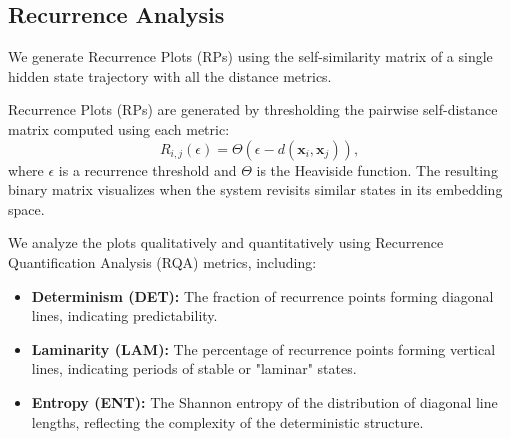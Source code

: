 \documentclass[a4paper,12pt]{article}
\begin{document}

\subsection{Recurrence Analysis}
\label{subsec:recurrence_analysis}
We generate Recurrence Plots (RPs) using the self-similarity matrix of a single hidden state trajectory with all the distance metrics. 

Recurrence Plots (RPs) are generated by thresholding the pairwise self-distance matrix computed using each metric:
\begin{equation}
    R_{i,j}(\epsilon) = \Theta(\epsilon - d(\mathbf{x}_i, \mathbf{x}_j)),
\end{equation}
where $\epsilon$ is a recurrence threshold and $\Theta$ is the Heaviside function. The resulting binary matrix visualizes when the system revisits similar states in its embedding space.

We analyze the plots qualitatively and quantitatively using Recurrence Quantification Analysis (RQA) metrics, including:
\begin{itemize}
    \item \textbf{Determinism (DET):} The fraction of recurrence points forming diagonal lines, indicating predictability.
    \item \textbf{Laminarity (LAM):} The percentage of recurrence points forming vertical lines, indicating periods of stable or "laminar" states.
    \item \textbf{Entropy (ENT):} The Shannon entropy of the distribution of diagonal line lengths, reflecting the complexity of the deterministic structure.
\end{itemize} %
\end{document}
